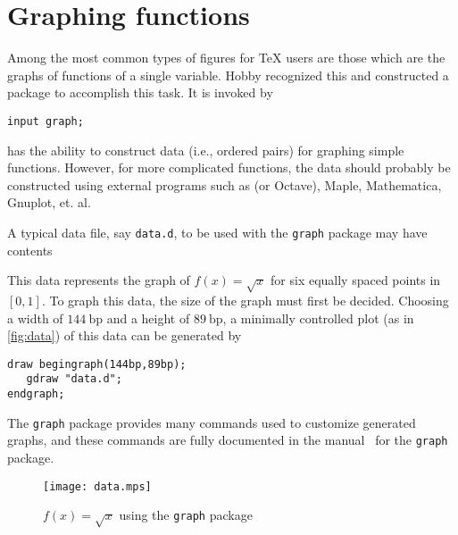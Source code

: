 \section{Graphing functions}
\label{sec:graphing}

Among the most common types of figures for \TeX{} users are those which
are the graphs of functions of a single variable.  Hobby recognized this
and constructed a package to accomplish this task.  It is invoked by

\begin{lstlisting}[xleftmargin=80bp]
input graph;
\end{lstlisting}

\MP{} has the ability to construct data (i.e., ordered pairs) for
graphing simple functions.  However, for more complicated functions, the
data should probably be constructed using external programs such as
 (or Octave), Maple, Mathematica, Gnuplot, et. al.

A typical data file, say \texttt{data.d}, to be used with
the \texttt{graph} package may have contents



This data represents the graph of $f(x)=\sqrt{x}$ for six equally spaced
points in $[0,1]$.  To graph this data, the size of the graph must first
be decided.  Choosing a width of $144\mathrm{\ bp}$ and a height of
$89\mathrm{\ bp}$, a minimally controlled plot (as in
\autoref{fig:data}) of this data can be generated by

\begin{lstlisting}[xleftmargin=38bp]
draw begingraph(144bp,89bp);
   gdraw "data.d";
endgraph;
\end{lstlisting}

The \texttt{graph} package provides many commands used to customize
generated graphs, and these commands are fully documented in the
manual~\cite{hobby:graph} for the \texttt{graph} package.

\begin{figure}
  \centering
  \texttt{[image: data.mps]}
  \caption{$f(x)=\sqrt{x}$ using the \texttt{graph} package}
  \label{fig:data}
\end{figure}
